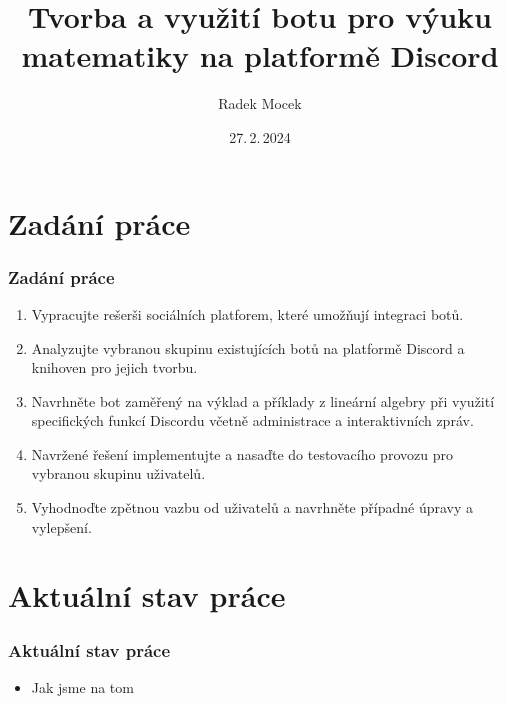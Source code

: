 \documentclass[FM]{tulpresentation}
\title{Tvorba a využití botu pro výuku matematiky na platformě Discord}
\author{Radek Mocek}
\institute{}
\date{27.\,2.\,2024}
\begin{document}
	\TULtitleframe
	\section{Zadání práce}
	\begin{frame}[fragile]
		\frametitle{Zadání práce}
		\begin{enumerate}
			\item Vypracujte rešerši sociálních platforem, které umožňují integraci botů.
			\item Analyzujte vybranou skupinu existujících botů na platformě Discord a knihoven pro jejich tvorbu.
			\item Navrhněte bot zaměřený na výklad a příklady z lineární algebry při využití specifických funkcí Discordu včetně administrace a interaktivních zpráv.
			\item Navržené řešení implementujte a nasaďte do testovacího provozu pro vybranou skupinu uživatelů.
			\item Vyhodnoďte zpětnou vazbu od uživatelů a navrhněte případné úpravy a vylepšení.
		\end{enumerate}
	\end{frame}
	\section{Aktuální stav práce}
	\begin{frame}[fragile]
		\frametitle{Aktuální stav práce}
		\begin{itemize}
			\item Jak jsme na tom
		\end{itemize}
	\end{frame}
\end{document}
